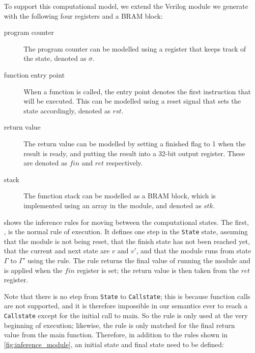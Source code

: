 To support this computational model, we extend the Verilog module we generate
with the following four registers and a \gls{BRAM} block:

\begin{description}
\item[program counter] The program counter can be modelled using a register that
  keeps track of the state, denoted as $\sigma$.
  \item[function entry point] When a function is called, the entry point denotes
    the first instruction that will be executed. This can be modelled using a
    reset signal that sets the state accordingly, denoted as $\mathit{rst}$.
  \item[return value] The return value can be modelled by setting a finished
    flag to 1 when the result is ready, and putting the result into a 32-bit
    output register. These are denoted as $\mathit{fin}$ and $\mathit{ret}$
    respectively.
  \item[stack] The function stack can be modelled as a \gls{BRAM} block, which
    is implemented using an array in the module, and denoted as $\mathit{stk}$.
\end{description}

 shows the inference rules for moving between the
computational states.  The first, , is the normal rule
of execution.  It defines one step in the \texttt{State} state, assuming that
the module is not being reset, that the finish state has not been reached yet,
that the current and next state are $v$ and $v'$, and that the module runs from
state $\Gamma$ to $\Gamma'$ using the  rule.  The
 rule returns the final value of running the module
and is applied when the $\mathit{fin}$ register is set; the return value is then
taken from the $\mathit{ret}$ register.

Note that there is no step from \texttt{State} to \texttt{Callstate}; this is
because function calls are not supported, and it is therefore impossible in our
semantics ever to reach a \texttt{Callstate} except for the initial call to
main. So the  rule is only used at the very beginning
of execution; likewise, the  rule is only matched for
the final return value from the main function.  Therefore, in addition to the
rules shown in \cref{fig:inference_module}, an initial state and final state
need to be defined:

